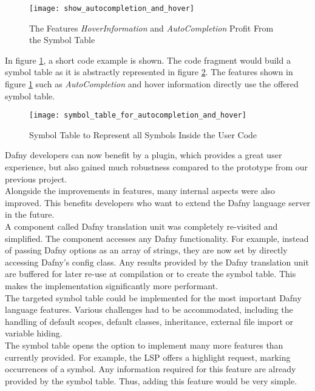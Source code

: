 \begin{figure}[H]
    \centering
    \texttt{[image: show\_autocompletion\_and\_hover]}
    \caption{The Features \textit{HoverInformation} and \textit{AutoCompletion} Profit From the Symbol Table}
    \label{fig:show_autocompletion_and_hover}
\end{figure}

In figure \ref{fig:show_autocompletion_and_hover}, a short code example is shown.
The code fragment would build a symbol table as it is abstractly represented in figure \ref{fig:symbol_table_for_autocompletion_and_hover}.
The features shown in figure \ref{fig:show_autocompletion_and_hover} such as \textit{AutoCompletion} and hover information directly use the offered symbol table.

\begin{figure}[H]
    \centering
    \texttt{[image: symbol\_table\_for\_autocompletion\_and\_hover]}
    \caption{Symbol Table to Represent all Symbols Inside the User Code}
    \label{fig:symbol_table_for_autocompletion_and_hover}
\end{figure}

Dafny developers can now benefit by a plugin, which provides a great user experience,
but also gained much robustness compared to the prototype from our previous project.\\

Alongside the improvements in features, many internal aspects were also improved.
This benefits developers who want to extend the Dafny language server in the future.\\

A component called Dafny translation unit was completely re-visited and simplified.
The component accesses any Dafny functionality.
For example, instead of passing Dafny options as an array of strings, they are now set by
directly accessing Dafny's config class.
Any results provided by the Dafny translation unit are buffered for later re-use at compilation or to create the symbol table.
This makes the implementation significantly more performant.\\

The targeted symbol table could be implemented for the most important Dafny language features.
Various challenges had to be accommodated, including the handling of default scopes, default classes, inheritance, external file import or variable hiding.\\

The symbol table opens the option to implement many more features than currently provided.
For example, the LSP offers a highlight request, marking occurrences of a symbol.
Any information required for this feature are already provided by the symbol table.
Thus, adding this feature would be very simple.\\

